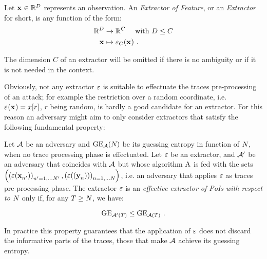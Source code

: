 \begin{definition}
Let $\sss[]{}\in \mathbb{R}^\traceLength$ represents an observation. An {\em Extractor of Feature}, or an {\em Extractor} for short, is any function of the form:
\begin{align*}
\mathbb{R}^\traceLength & \rightarrow \mathbb{R}^\newTraceLength \quad \mbox{ with } \traceLength \leq \newTraceLength \\
\sss[]{} & \mapsto \extractor[\newTraceLength]{\sss[]{}} \mbox{ .}
\end{align*}
\end{definition}
\begin{notation}
The dimension $C$ of an extractor will be omitted if there is no ambiguity or if it is not needed in the context.
\end{notation}
Obviously, not any extractor $\extract$ is suitable to effectuate the traces pre-processing of an attack; for example the restriction over a random coordinate, i.e. $\extractor{\sss[]{}} = x[r]$, $r$ being random, is hardly a good candidate for an extractor. For this reason an adversary might aim to only consider extractors that satisfy the following fundamental property:

\begin{property}
Let $\adversary$ be an adversary and $\guessingEntropy_\adversary(\numTraces[])$ be its guessing entropy in function of $\numTraces[]$, when no trace processing phase is effectuated. Let $\extract$ be an extractor, and $\adversary'$ be an adversary that coincides with $\adversary$ but whose algorithm $\attackAlgorithm$ is fed with the sets $ \left( \left(\extract(\sss[]{n'})\right)_{n'=1,\dots \numTraces[]'}, \left(\extract((\sssTest[]{n}))\right)_{n=1,\dots \numTraces[]} \right)$, i.e. an adversary that applies $\extract$ as traces pre-processing phase. The extractor $\extract$ is an {\em effective  extractor of PoIs with respect to $\numTraces[]$} only if, for any $T \geq\numTraces[] $, we have:

\begin{equation}\label{eq:effective}
\guessingEntropy_{\adversary'(T)} \leq \guessingEntropy_{\adversary(T)}\mbox{ .}
\end{equation}

\end{property}
In practice this property guarantees that the application of $\extract$ does not discard the informative parts of the traces, those that make $\adversary$ achieve its guessing entropy.

